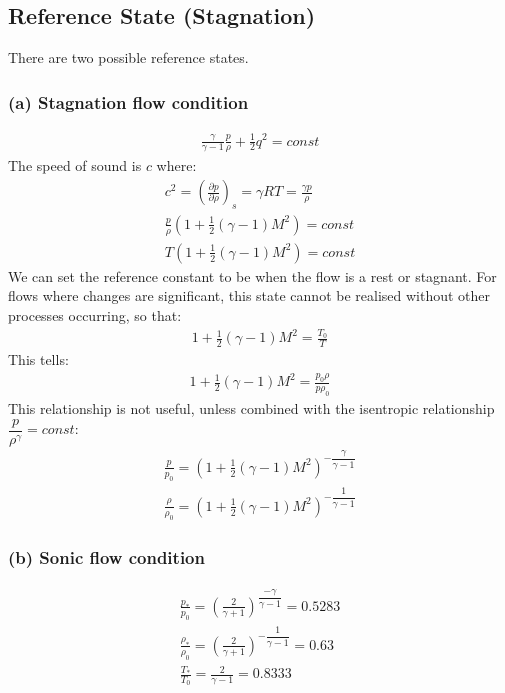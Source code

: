 \documentclass[class=report, crop=false, 12pt,a4paper]{standalone}
\begin{document}
\subsection{Reference State (Stagnation)}
There are two possible reference states. 
\subsubsection{(a) Stagnation flow condition}
\begin{gather}
    \frac{\gamma}{\gamma - 1} \frac{p}{\rho} + \frac{1}{2}q^2 = const
\end{gather}
The speed of sound is $c$ where: 
\begin{gather}
    c^2 = \left( \frac{\partial p}{\partial \rho} \right)_s = \gamma R T = \frac{\gamma p}{\rho} \\[5pt]
    \frac{p}{\rho} \left( 1 + \frac{1}{2}(\gamma-1)M^2 \right) = const \\[5pt] 
    T \left( 1 + \frac{1}{2}(\gamma - 1)M^2 \right) = const
\end{gather}
We can set the reference constant to be when the flow is a rest or stagnant. For flows where changes are significant, this state cannot be realised without other processes occurring, so that: 
\begin{gather}
    1 + \frac{1}{2}(\gamma - 1)M^2 = \frac{T_0}{T}
\end{gather}
This tells: 
\begin{gather}
    1 + \frac{1}{2}(\gamma - 1)M^2 = \frac{p_0 \rho}{p \rho_0}
\end{gather}
This relationship is not useful, unless combined with the isentropic relationship $\dfrac{p}{\rho^{\gamma}} = const$: 
\begin{gather}
    \frac{p}{p_0} = \left( 1 + \frac{1}{2}(\gamma-1)M^2 \right)^{-\dfrac{\gamma}{\gamma-1}} \\[5pt]
    \frac{\rho}{\rho_0} = \left( 1 + \frac{1}{2}(\gamma-1)M^2 \right)^{-\dfrac{1}{\gamma-1}} 
\end{gather}
\subsubsection{(b) Sonic flow condition} 
\begin{gather}
    \frac{p_{*}}{p_0} = \left( \frac{2}{\gamma+1} \right)^{\dfrac{-\gamma}{\gamma-1}} = 0.5283 \\[5pt]
    \frac{\rho_{*}}{\rho_0} = \left( \frac{2}{\gamma+1} \right)^{-\dfrac{1}{\gamma-1}} = 0.63 \\[5pt] 
    \frac{T_{*}}{T_0} = \frac{2}{\gamma-1} = 0.8333
\end{gather}
\end{document}
